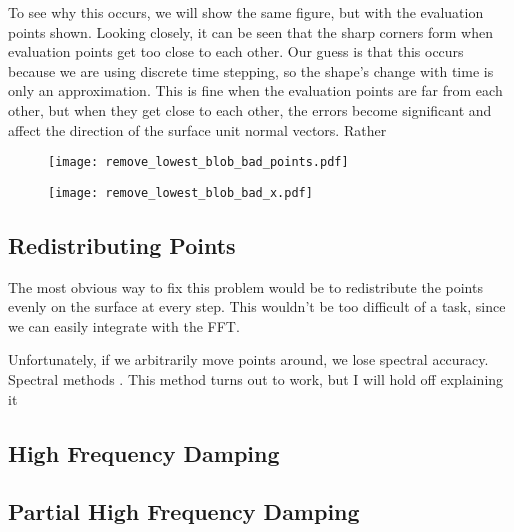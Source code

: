 To see why this occurs, we will show the same figure, but with the evaluation points shown. Looking closely, it can be seen that the sharp corners form when evaluation points get too close to each other. Our guess is that this occurs because we are using discrete time stepping, so the shape's change with time is only an approximation. This is fine when the evaluation points are far from each other, but when they get close to each other, the errors become significant and affect the direction of the surface unit normal vectors. Rather  

\begin{figure}[H]
    \begin{center}
      \texttt{[image: remove\_lowest\_blob\_bad\_points.pdf]}
    \end{center}
  \vspace{-.2in} %
  \caption{\label{fig:remove-lowest-blog-bad-points}}
\end{figure}

\begin{figure}[H]
    \begin{center}
      \texttt{[image: remove\_lowest\_blob\_bad\_x.pdf]}
    \end{center}
  \vspace{-.2in} %
  \caption{\label{fig:remove-lowest-blob-bad-x}}
\end{figure}

\subsection*{Redistributing Points}

The most obvious way to fix this problem would be to redistribute the points evenly on the surface at every step. This wouldn't be too difficult of a task, since we can easily integrate with the FFT. 

Unfortunately, if we arbitrarily move points around, we lose spectral accuracy. Spectral methods . This method turns out to work, but I will hold off explaining it 

\subsection*{High Frequency Damping}


\subsection*{Partial High Frequency Damping}

